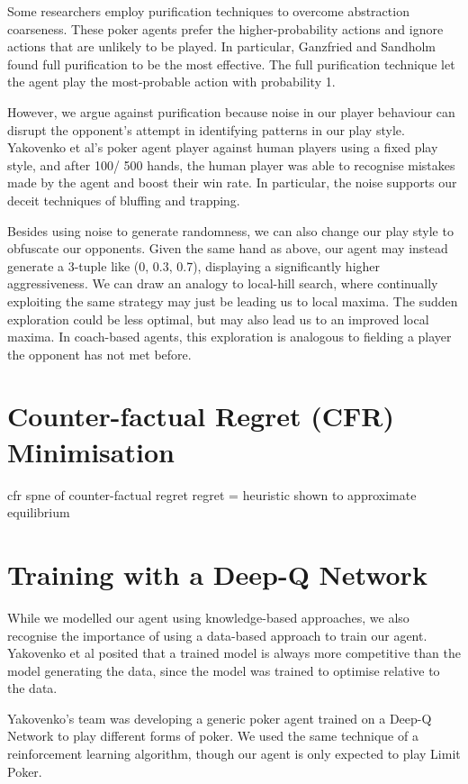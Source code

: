 \documentclass{article}
\begin{document}
Some researchers employ purification techniques to overcome abstraction coarseness. These poker agents prefer the higher-probability actions and ignore actions that are unlikely to be played. In particular, Ganzfried and Sandholm found full purification to be the most effective. The full purification technique let the agent play the most-probable action with probability 1.

However, we argue against purification because noise in our player behaviour can disrupt the opponent's attempt in identifying patterns in our play style. Yakovenko et al's poker agent player against human players using a fixed play style, and after 100/ 500 hands, the human player was able to recognise mistakes made by the agent and boost their win rate. In particular, the noise supports our deceit techniques of bluffing and trapping.

Besides using noise to generate randomness, we can also change our play style to obfuscate our opponents. Given the same hand as above, our agent may instead generate a 3-tuple like (0, 0.3, 0.7), displaying a significantly higher aggressiveness. We can draw an analogy to local-hill search, where continually exploiting the same strategy may just be leading us to local maxima. The sudden exploration could be less optimal, but may also lead us to an improved local maxima. In coach-based agents, this exploration is analogous to fielding a player the opponent has not met before.

\section{Counter-factual Regret (CFR) Minimisation}

cfr
spne of counter-factual regret
regret = heuristic
shown to approximate equilibrium

\section{Training with a Deep-Q Network}

While we modelled our agent using knowledge-based approaches, we also recognise the importance of using a data-based approach to train our agent. Yakovenko et al posited that a trained model is always more competitive than the model generating the data, since the model was trained to optimise relative to the data. 

Yakovenko's team was developing a generic poker agent trained on a Deep-Q Network to play different forms of poker. We used the same technique of a reinforcement learning algorithm, though our agent is only expected to play Limit Poker.
\end{document}

